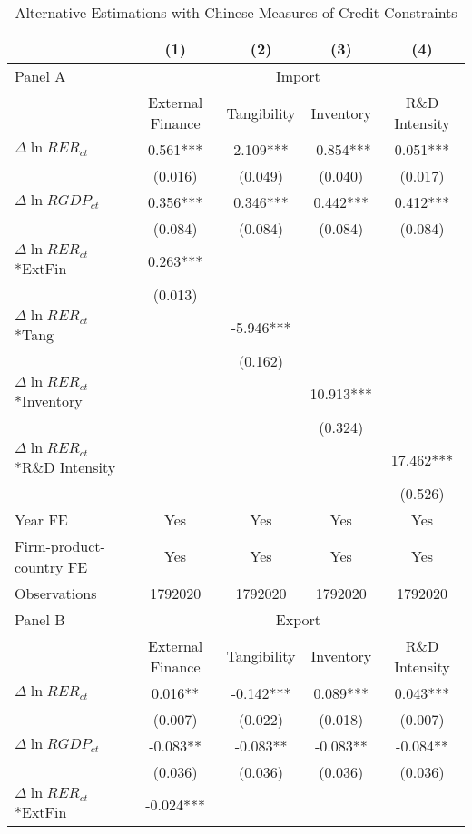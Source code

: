 \begin{table}[htbp]
	\centering
	\caption{Alternative Estimations with Chinese Measures of Credit Constraints}
	\begin{threeparttable}
	\begin{tabular}{lcccc}
		\toprule
		& (1)   & (2)   & (3)   & (4) \\
		\midrule
		Panel A & \multicolumn{4}{c}{Import} \\
		& External Finance & Tangibility & Inventory & R\&D Intensity \\
		\midrule
		$\Delta \ln RER_{ct}$ & 0.561*** & 2.109*** & -0.854*** & 0.051*** \\
		& (0.016) & (0.049) & (0.040) & (0.017) \\
		$\Delta \ln RGDP_{ct}$ & 0.356*** & 0.346*** & 0.442*** & 0.412*** \\
		& (0.084) & (0.084) & (0.084) & (0.084) \\
		$\Delta \ln RER_{ct}$*ExtFin & 0.263*** &       &       &  \\
		& (0.013) &       &       &  \\
		$\Delta \ln RER_{ct}$*Tang &       & -5.946*** &       &  \\
		&       & (0.162) &       &  \\
		$\Delta \ln RER_{ct}$*Inventory &       &       & 10.913*** &  \\
		&       &       & (0.324) &  \\
		$\Delta \ln RER_{ct}$*R\&D Intensity &       &       &       & 17.462*** \\
		&       &       &       & (0.526) \\
		Year FE  & Yes   & Yes   & Yes   & Yes \\
		Firm-product-country FE & Yes   & Yes   & Yes   & Yes \\
		Observations & 1792020 & 1792020 & 1792020 & 1792020 \\
		\midrule
		Panel B & \multicolumn{4}{c}{Export} \\
		& External Finance & Tangibility & Inventory & R\&D Intensity \\
		\midrule
		$\Delta \ln RER_{ct}$ & 0.016** & -0.142*** & 0.089*** & 0.043*** \\
		& (0.007) & (0.022) & (0.018) & (0.007) \\
		$\Delta \ln RGDP_{ct}$ & -0.083** & -0.083** & -0.083** & -0.084** \\
		& (0.036) & (0.036) & (0.036) & (0.036) \\
		$\Delta \ln RER_{ct}$*ExtFin & -0.024*** &       &       &  \\

\end{tabular}
\end{threeparttable}
\end{table}
